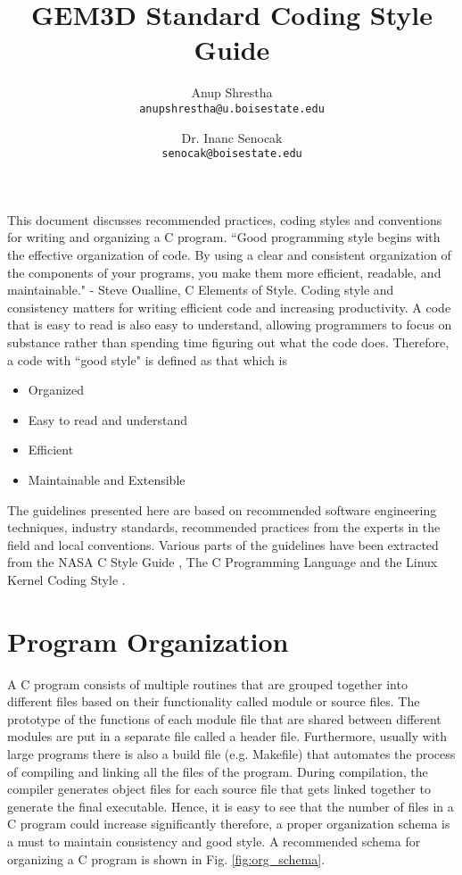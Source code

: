 \documentclass[11pt]{article}
\title{GEM3D Standard Coding Style Guide}
\author{
	Anup Shrestha\\ \texttt{anupshrestha@u.boisestate.edu} \and
	Dr. Inanc Senocak\\ \texttt{senocak@boisestate.edu}
}
\begin{document}
\maketitle

This document discusses recommended practices, coding styles and conventions for writing and organizing a C program. ``Good programming style begins with the effective organization of code. By using a clear and consistent organization of the components of your programs, you make them more efficient, readable, and maintainable." - Steve Oualline, C Elements of Style. Coding style and consistency matters for writing efficient code and increasing productivity. A code that is easy to read is also easy to understand, allowing programmers to focus on substance rather than spending time figuring out what the code does. Therefore, a code with ``good style" is defined as that which is 

\begin{itemize}
	\item Organized
	\item Easy to read and understand
	\item Efficient
	\item Maintainable and Extensible
\end{itemize}

The guidelines presented here are based on recommended software engineering techniques, industry standards, recommended practices from the experts in the field and local conventions. Various parts of the guidelines have been extracted from the NASA C Style Guide \cite{nasa_style1994}, The C Programming Language \cite{c_style} and the Linux Kernel Coding Style \cite{linux_style}.  

\section{Program Organization}
A C program consists of multiple routines that are grouped together into different files based on their functionality called module or source files. The prototype of the functions of each module file that are shared between different modules are put in a separate file called a header file. Furthermore, usually with large programs there is also a build file (e.g. Makefile) that automates the process of compiling and linking all the files of the program. During compilation, the compiler generates object files for each source file that gets linked together to generate the final executable. Hence, it is easy to see that the number of files in a C program could increase significantly therefore, a proper organization schema is a must to maintain consistency and good style. A recommended schema for organizing a C program is shown in Fig. \ref{fig:org_schema}.
\end{document}
